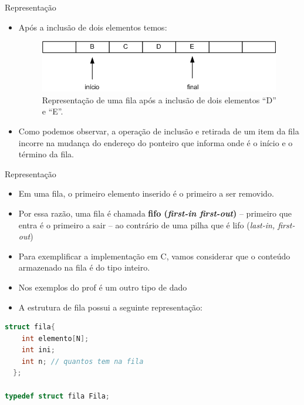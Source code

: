 \begin{frame}{Representação}
\begin{itemize}
	\item Após a inclusão de dois elementos temos:
	\begin{figure}[ht]
				\centering
				\includegraphics[width=.6\textwidth]{figs/fig_filas/exemplo_fila_tres_inclusao.png}
				\caption{Representação de uma fila após a inclusão de dois elementos ``D'' e ``E''.}	
			\end{figure} 
\end{itemize}

\begin{itemize}

	\item Como podemos observar, a operação de inclusão e retirada de um item da fila 
	incorre na mudança do endereço do ponteiro que informa onde é o início e o término da fila.
\end{itemize}

\end{frame}



\begin{frame}[fragile]{Representação}
\begin{itemize}
	\item Em uma fila, o \alert{primeiro} elemento inserido é o primeiro a ser removido.
	\item Por essa razão, uma fila é chamada \textbf{\alert{fifo (\textit{first-in first-out})}} -- primeiro que entra é o primeiro a sair -- ao contrário de uma pilha que é \alert{lifo} (\textit{last-in, first-out})
	\item Para exemplificar a implementação em C, vamos considerar que o 
	conteúdo armazenado na fila é do tipo inteiro.
	\item Nos exemplos do prof é um outro tipo de dado
	\item A estrutura de fila possui a seguinte representação:	
\end{itemize}
\footnotesize
\begin{lstlisting}[language=C]
  struct fila{
    int elemento[N];
    int ini;
    int n; // quantos tem na fila
  };
  
typedef struct fila Fila;
\end{lstlisting}
\end{frame}



